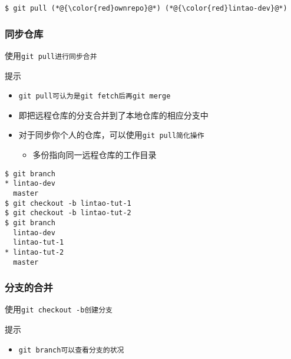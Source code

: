 \newsavebox{\QuickStartDybDevPull}
\begin{lrbox}{\QuickStartDybDevPull}
\begin{lstlisting}
$ git pull (*@{\color{red}ownrepo}@*) (*@{\color{red}lintao-dev}@*)
\end{lstlisting}
\end{lrbox}

\begin{frame}
    \frametitle{同步仓库}
    \begin{block}{使用\tt{git pull}进行同步合并}
        \par\usebox{\QuickStartDybDevPull}
    \end{block}
    \begin{alertblock}{提示}
        \begin{itemize}    
            \item \tt{git pull}可认为是\tt{git fetch}后再\tt{git merge}
            \item 即把远程仓库的分支合并到了本地仓库的相应分支中
            \item 对于同步你个人的仓库，可以使用\tt{git pull}简化操作
                \begin{itemize}
                    \item 多份指向同一远程仓库的工作目录
                \end{itemize}
        \end{itemize}
    \end{alertblock}
\end{frame}

\newsavebox{\QuickStartDybDevMerge}
\begin{lrbox}{\QuickStartDybDevMerge}
\begin{lstlisting}
$ git branch 
* lintao-dev
  master
$ git checkout -b lintao-tut-1
$ git checkout -b lintao-tut-2
$ git branch 
  lintao-dev
  lintao-tut-1
* lintao-tut-2
  master
\end{lstlisting}
\end{lrbox}

\begin{frame}
    \frametitle{分支的合并}
    \begin{block}{使用\tt{git checkout -b}创建分支}
        \par\usebox{\QuickStartDybDevMerge}
    \end{block}
    \begin{alertblock}{提示}
        \begin{itemize}    
            \item \tt{git branch}可以查看分支的状况
        \end{itemize}
    \end{alertblock}
\end{frame}

